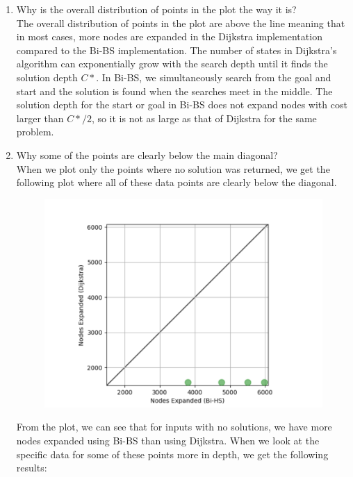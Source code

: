 \documentclass[8pt, letterpaper, titlepage]{article}
\begin{document}
\begin{enumerate}
  \item Why is the overall distribution of points in the plot the way it is?\\
    The overall distribution of points in the plot are above the line meaning that in most cases, more nodes are expanded in the Dijkstra implementation compared to the Bi-BS implementation. The number of states in Dijkstra's algorithm can exponentially grow with the search depth until it finds the solution depth $C*$. In Bi-BS, we simultaneously search from the goal and start and the solution is found when the searches meet in the middle. The solution depth for the start or goal in Bi-BS does not expand nodes with cost larger than $C*/2$, so it is not as large as that of Dijkstra for the same problem.
  \item Why some of the points are clearly below the main diagonal?\\
    When we plot only the points where no solution was returned, we get the following plot where all of these data points are clearly below the diagonal. 
  \begin{figure}[H]
    \begin{center}    
      \includegraphics[width=\linewidth*3/6]{image2.png}
    \end{center}
  \end{figure}
  From the plot, we can see that for inputs with no solutions, we have more nodes expanded using Bi-BS than using Dijkstra. When we look at the specific data for some of these points more in depth, we get the following results:


\end{enumerate}
\end{document}
